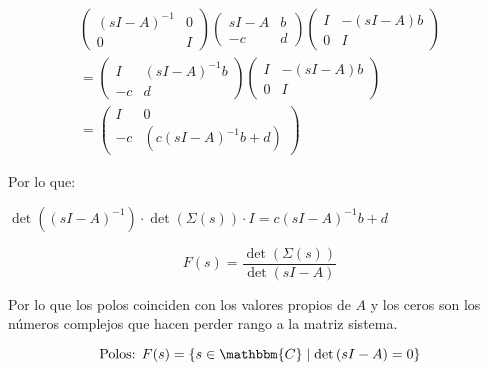         \begin{multline}
            \begin{pmatrix}
            (sI - A)^{-1} & 0 \\
            0 & I
            \end{pmatrix}
            \begin{pmatrix}
            sI - A & b \\
            -c & d
            \end{pmatrix}
            \begin{pmatrix}
            I & -(sI - A)b \\
            0 & I
            \end{pmatrix}
            \\
            =
            \begin{pmatrix}
            I & (sI - A)^{-1} b \\
            -c & d
            \end{pmatrix}
            \begin{pmatrix}
            I & -(sI - A)b \\
            0 & I
            \end{pmatrix}
            \\
            =
            \begin{pmatrix}
            I & 0 \\
            -c & (c(sI - A)^{-1} b + d)
            \end{pmatrix}
            \nonumber
        \end{multline}

        Por lo que:

        \begin{math}
            \det{\left( (sI - A)^{-1} \right)} \cdot \det{\left( \Sigma(s) \right)} \cdot I = c(sI - A)^{-1} b + d
        \end{math}

        \begin{equation}
            F(s) = \frac{\det{\left( \Sigma(s) \right)}}{\det{\left( sI - A \right)}}
        \end{equation}

        Por lo que los polos coinciden con los valores propios de $A$ y los ceros son los números complejos que hacen perder rango a la matriz sistema.

        \begin{equation}
            \text{Polos: } F(s) = \left\{ s \in \mathbbm{C} \mid \det{\left( sI - A \right)} = 0 \right\}
        \end{equation}

